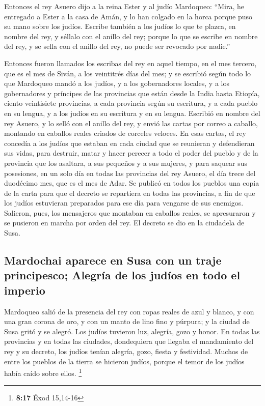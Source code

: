 \begin{paracol}{2}
 Entonces el rey Asuero dijo a la reina Ester y al judío
Mardoqueo: ``Mira, he entregado a Ester a la casa de Amán, y lo han
colgado en la horca porque puso su mano sobre los judíos. 
Escribe también a los judíos lo que te plazca, en nombre del rey, y
séllalo con el anillo del rey; porque lo que se escribe en nombre del
rey, y se sella con el anillo del rey, no puede ser revocado por
nadie.''

 Entonces fueron llamados los escribas del rey en aquel
tiempo, en el mes tercero, que es el mes de Siván, a los veintitrés días
del mes; y se escribió según todo lo que Mardoqueo mandó a los judíos, y
a los gobernadores locales, y a los gobernadores y príncipes de las
provincias que están desde la India hasta Etiopía, ciento veintisiete
provincias, a cada provincia según su escritura, y a cada pueblo en su
lengua, y a los judíos en su escritura y en su lengua. 
Escribió en nombre del rey Asuero, y lo selló con el anillo del rey, y
envió las cartas por correo a caballo, montando en caballos reales
criados de corceles veloces.  En esas cartas, el rey
concedía a los judíos que estaban en cada ciudad que se reunieran y
defendieran sus vidas, para destruir, matar y hacer perecer a todo el
poder del pueblo y de la provincia que los asaltara, a sus pequeños y a
sus mujeres, y para saquear sus posesiones,  en un solo
día en todas las provincias del rey Asuero, el día trece del duodécimo
mes, que es el mes de Adar.  Se publicó en todos los
pueblos una copia de la carta para que el decreto se repartiera en todas
las provincias, a fin de que los judíos estuvieran preparados para ese
día para vengarse de sus enemigos.  Salieron, pues, los
mensajeros que montaban en caballos reales, se apresuraron y se pusieron
en marcha por orden del rey. El decreto se dio en la ciudadela de Susa.

\hypertarget{mardochai-aparece-en-susa-con-un-traje-principesco-alegruxeda-de-los-juduxedos-en-todo-el-imperio}{%
\subsection{Mardochai aparece en Susa con un traje principesco; Alegría
de los judíos en todo el
imperio}\label{mardochai-aparece-en-susa-con-un-traje-principesco-alegruxeda-de-los-juduxedos-en-todo-el-imperio}}

 Mardoqueo salió de la presencia del rey con ropas reales
de azul y blanco, y con una gran corona de oro, y con un manto de lino
fino y púrpura; y la ciudad de Susa gritó y se alegró. 
Los judíos tuvieron luz, alegría, gozo y honor.  En todas
las provincias y en todas las ciudades, dondequiera que llegaba el
mandamiento del rey y su decreto, los judíos tenían alegría, gozo,
fiesta y festividad. Muchos de entre los pueblos de la tierra se
hicieron judíos, porque el temor de los judíos había caído sobre ellos.
\footnote{\textbf{8:17} Éxod 15,14-16}


\end{paracol}
